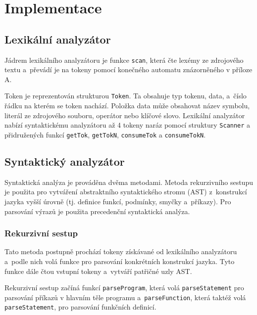 \documentclass[12pt,a4paper,titlepage,final]{article}
\begin{document}
\section{Implementace} \label{implementace}
\subsection{Lexikální analyzátor}
Jádrem lexikálního analyzátoru je funkce \texttt{scan}, která čte lexémy ze zdrojového 
textu a~převádí je na tokeny pomocí konečného automatu znázorněného v příloze A.

Token je reprezentován strukturou \texttt{Token}. Ta obsahuje typ tokenu, data, a~číslo 
řádku na kterém se token nachází. Položka data může obsahovat název symbolu, literál ze 
zdrojového souboru, operátor nebo klíčové slovo. Lexikální analyzátor nabízí syntaktickému 
analyzátoru až 4 tokeny naráz pomocí struktury \texttt{Scanner} a přidružených funkcí 
\texttt{getTok}, \texttt{getTokN}, \texttt{consumeTok} a \texttt{consumeTokN}.
\subsection{Syntaktický analyzátor}
Syntaktická analýza je prováděna dvěma metodami. Metoda rekurzivního 
sestupu je použita pro vytváření abstraktního syntaktického stromu (AST) 
z~konstrukcí jazyka vyšší úrovně (tj. definice funkcí, podmínky, smyčky 
a~příkazy). Pro parsování výrazů je použita precedenční syntaktická 
analýza.

\subsubsection{Rekurzivní sestup}
Tato metoda postupně prochází tokeny získávané od lexikálního analyzátoru 
a~podle nich volá funkce pro parsování konkrétních konstrukcí jazyka. 
Tyto funkce dále čtou vstupní tokeny a~vytváří patřičné uzly AST.

Rekurzivní sestup začíná funkcí \texttt{parseProgram}, která volá 
\texttt{parseStatement} pro parsování příkazů v hlavním těle programu 
a~\texttt{parseFunction}, která taktéž volá \texttt{parseStatement}, 
pro parsování funkčních definicí.
\end{document}
